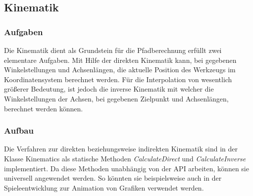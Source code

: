 
\subsection{Kinematik}

\subsubsection{Aufgaben}
Die Kinematik dient als Grundstein für die Pfadberechnung erfüllt zwei elementare Aufgaben. Mit Hilfe der direkten Kinematik kann, bei gegebenen Winkelstellungen und Achsenlängen, die aktuelle Position des Werkzeugs im Koordinatensystem berechnet werden. Für die Interpolation von wesentlich größerer Bedeutung, ist jedoch die inverse Kinematik mit welcher die Winkelstellungen der Achsen, bei gegebenen Zielpunkt und Achsenlängen, berechnet werden können.

\subsubsection{Aufbau}
Die Verfahren zur direkten beziehungsweise indirekten Kinematik sind in der Klasse Kinematics als statische Methoden \textit{CalculateDirect} und \textit{CalculateInverse} implementiert. Da diese Methoden unabhängig von der API arbeiten, können sie universell angewendet werden. So könnten sie beispielsweise auch in der Spieleentwicklung zur Animation von Grafiken verwendet werden.

